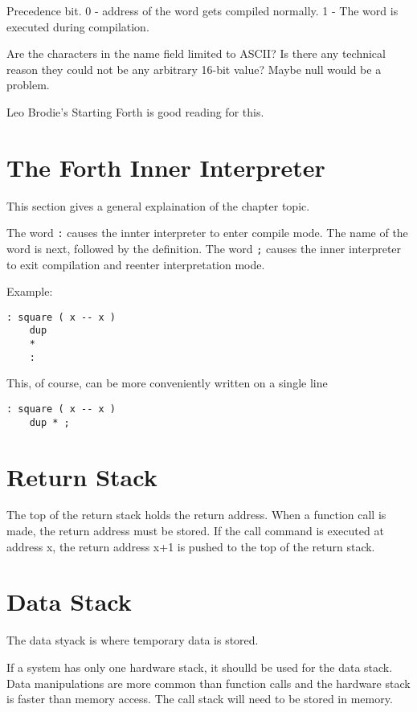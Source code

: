 Precedence bit. 0 - address of the word gets compiled normally. 1 - The word is executed 
during compilation.

Are the characters in the name field limited to ASCII? Is there any technical reason they
could not be any arbitrary 16-bit value? Maybe null would be a problem.

Leo Brodie's Starting Forth is good reading for this.

%
\section{The Forth Inner Interpreter}
This section gives a general explaination 
of the chapter topic.

The word \lstinline|:| causes the innter interpreter to enter compile mode. The name of the
word is next, followed by the definition. The word \lstinline|;| causes the inner
interpreter to exit compilation and reenter interpretation mode.

Example:
\begin{lstlisting}[caption={Definition of \lstinline|dup| in Forth.}]
: square ( x -- x )
    dup
    *
    :
\end{lstlisting}

This, of course, can be more conveniently written on a single line
\begin{lstlisting}[style=kaolstplain,linewidth=1.5\textwidth]
: square ( x -- x )
    dup * ;
\end{lstlisting}

\section{Return Stack}
The top of the return stack holds the return address. When a function call is made, the return address
must be stored.  If the call command is executed at address x, the return address x+1 is pushed to the top of the return stack.

\section{Data Stack}
The data styack is where temporary data is stored.

If a system has only one hardware stack, it shoulld be used for the data stack. Data 
manipulations are more common than function calls and the hardware stack is faster 
than memory access. The call stack will need to be stored in memory.

